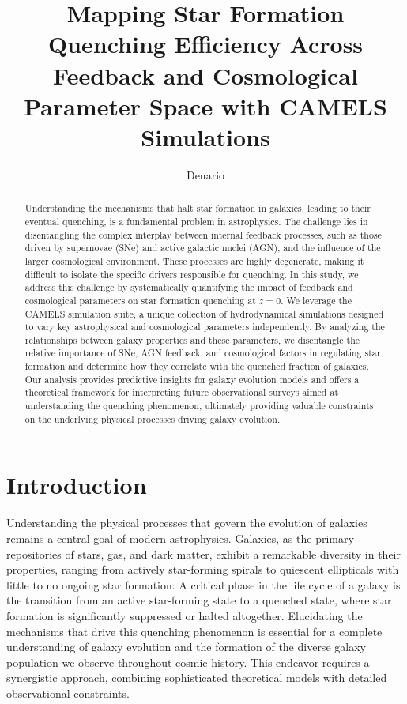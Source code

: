 \documentclass[twocolumn]{aastex631}
\begin{document}
\title{Mapping Star Formation Quenching Efficiency Across Feedback and Cosmological Parameter Space with CAMELS Simulations}

\author{Denario}

\begin{abstract}
Understanding the mechanisms that halt star formation in galaxies, leading to their eventual quenching, is a fundamental problem in astrophysics. The challenge lies in disentangling the complex interplay between internal feedback processes, such as those driven by supernovae (SNe) and active galactic nuclei (AGN), and the influence of the larger cosmological environment. These processes are highly degenerate, making it difficult to isolate the specific drivers responsible for quenching. In this study, we address this challenge by systematically quantifying the impact of feedback and cosmological parameters on star formation quenching at $z=0$. We leverage the CAMELS simulation suite, a unique collection of hydrodynamical simulations designed to vary key astrophysical and cosmological parameters independently. By analyzing the relationships between galaxy properties and these parameters, we disentangle the relative importance of SNe, AGN feedback, and cosmological factors in regulating star formation and determine how they correlate with the quenched fraction of galaxies. Our analysis provides predictive insights for galaxy evolution models and offers a theoretical framework for interpreting future observational surveys aimed at understanding the quenching phenomenon, ultimately providing valuable constraints on the underlying physical processes driving galaxy evolution.
\end{abstract}



\section{Introduction}
\label{sec:intro}
Understanding the physical processes that govern the evolution of galaxies remains a central goal of modern astrophysics. Galaxies, as the primary repositories of stars, gas, and dark matter, exhibit a remarkable diversity in their properties, ranging from actively star-forming spirals to quiescent ellipticals with little to no ongoing star formation. A critical phase in the life cycle of a galaxy is the transition from an active star-forming state to a quenched state, where star formation is significantly suppressed or halted altogether. Elucidating the mechanisms that drive this quenching phenomenon is essential for a complete understanding of galaxy evolution and the formation of the diverse galaxy population we observe throughout cosmic history. This endeavor requires a synergistic approach, combining sophisticated theoretical models with detailed observational constraints.
\end{document}
